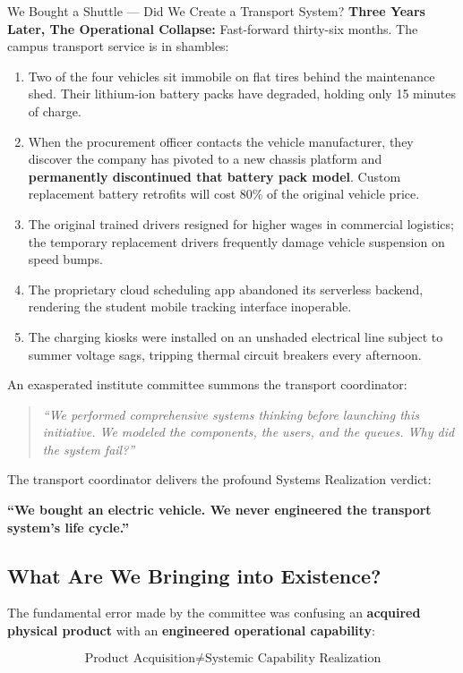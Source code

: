 \begin{storybox}{We Bought a Shuttle --- Did We Create a Transport System?}
\textbf{Three Years Later, The Operational Collapse:}
Fast-forward thirty-six months. The campus transport service is in shambles:
\begin{enumerate}[leftmargin=1.5em]
    \item Two of the four vehicles sit immobile on flat tires behind the maintenance shed. Their lithium-ion battery packs have degraded, holding only 15 minutes of charge. 
    \item When the procurement officer contacts the vehicle manufacturer, they discover the company has pivoted to a new chassis platform and \textbf{permanently discontinued that battery pack model}. Custom replacement battery retrofits will cost 80\% of the original vehicle price.
    \item The original trained drivers resigned for higher wages in commercial logistics; the temporary replacement drivers frequently damage vehicle suspension on speed bumps.
    \item The proprietary cloud scheduling app abandoned its serverless backend, rendering the student mobile tracking interface inoperable.
    \item The charging kiosks were installed on an unshaded electrical line subject to summer voltage sags, tripping thermal circuit breakers every afternoon.
\end{enumerate}

An exasperated institute committee summons the transport coordinator:
\begin{quote}
\textit{``We performed comprehensive systems thinking before launching this initiative. We modeled the components, the users, and the queues. Why did the system fail?''}
\end{quote}
The transport coordinator delivers the profound Systems Realization verdict:
\begin{center}
\textbf{\large ``We bought an electric vehicle. We never engineered the transport system's life cycle.''}
\end{center}
\end{storybox}

\subsection{What Are We Bringing into Existence?}
The fundamental error made by the committee was confusing an \textbf{acquired physical product} with an \textbf{engineered operational capability}:

\begin{equation}
    \text{Product Acquisition} \ne \text{Systemic Capability Realization}
\end{equation}


